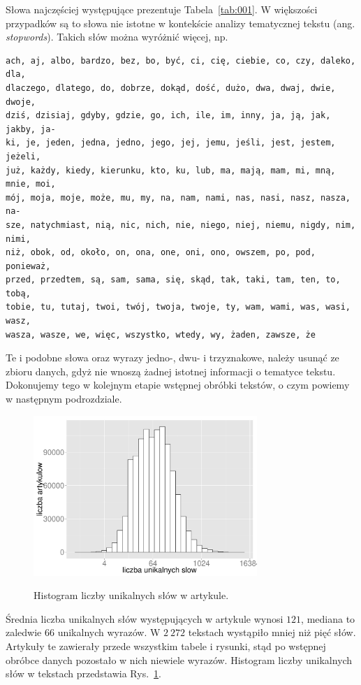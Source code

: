\documentclass{praca1}
\begin{document}
Słowa najczęściej występujące prezentuje Tabela~\ref{tab:001}. W większości przypadków są to słowa nie istotne w kontekście analizy tematycznej tekstu (ang. \emph{stopwords}). Takich słów można wyróżnić więcej, np.
\begin{verbatim}
ach, aj, albo, bardzo, bez, bo, być, ci, cię, ciebie, co, czy, daleko, dla,
dlaczego, dlatego, do, dobrze, dokąd, dość, dużo, dwa, dwaj, dwie, dwoje, 
dziś, dzisiaj, gdyby, gdzie, go, ich, ile, im, inny, ja, ją, jak, jakby, ja-
ki, je, jeden, jedna, jedno, jego, jej, jemu, jeśli, jest, jestem, jeżeli, 
już, każdy, kiedy, kierunku, kto, ku, lub, ma, mają, mam, mi, mną, mnie, moi,
mój, moja, moje, może, mu, my, na, nam, nami, nas, nasi, nasz, nasza, na-
sze, natychmiast, nią, nic, nich, nie, niego, niej, niemu, nigdy, nim, nimi,
niż, obok, od, około, on, ona, one, oni, ono, owszem, po, pod, ponieważ, 
przed, przedtem, są, sam, sama, się, skąd, tak, taki, tam, ten, to, tobą, 
tobie, tu, tutaj, twoi, twój, twoja, twoje, ty, wam, wami, was, wasi, wasz, 
wasza, wasze, we, więc, wszystko, wtedy, wy, żaden, zawsze, że
\end{verbatim}

Te i podobne słowa oraz wyrazy jedno-, dwu- i trzyznakowe, należy usunąć ze zbioru danych, gdyż nie wnoszą żadnej istotnej informacji o tematyce tekstu. Dokonujemy tego w kolejnym etapie wstępnej obróbki tekstów, o czym powiemy w następnym podrozdziale.

\begin{figure}[!h]
  \centering
  \includegraphics[width=240pt]{plot4.pdf}\\
  \caption{Histogram liczby unikalnych słów w artykule.}\label{plot:004}
\end{figure}


Średnia liczba unikalnych słów występujących w artykule wynosi $121$, mediana to zaledwie $66$ unikalnych wyrazów. W $2\ 272$ tekstach wystąpiło mniej niż pięć słów. Artykuły te zawierały przede wszystkim tabele i rysunki, stąd po wstępnej obróbce danych pozostało w nich niewiele wyrazów. Histogram liczby unikalnych słów w tekstach przedstawia Rys.~\ref{plot:004}.
\end{document}
